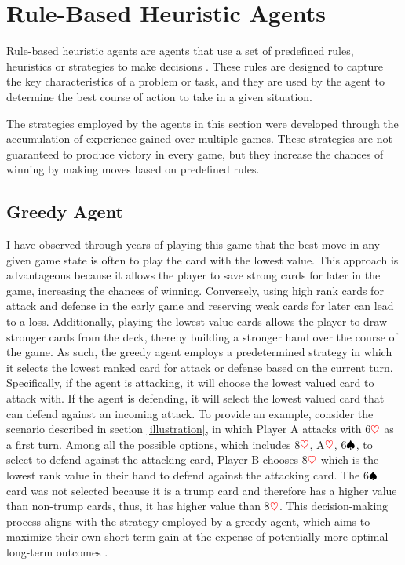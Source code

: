 \section{Rule-Based Heuristic Agents}

Rule-based heuristic agents are agents that use a set of predefined rules, heuristics or strategies to make decisions \citep{millington_funge_2009}. These rules are designed to capture the key characteristics of a problem or task, and they are used by the agent to determine the best course of action to take in a given situation.

The strategies employed by the agents in this section were developed through the accumulation of experience gained over multiple games. These strategies are not guaranteed to produce victory in every game, but they increase the chances of winning by making moves based on predefined rules. 

\subsection{Greedy Agent}

I have observed through years of playing this game that the best move in any given game state is often to play the card with the lowest value. This approach is advantageous because it allows the player to save strong cards for later in the game, increasing the chances of winning. Conversely, using high rank cards for attack and defense in the early game and reserving weak cards for later can lead to a loss. Additionally, playing the lowest value cards allows the player to draw stronger cards from the deck, thereby building a stronger hand over the course of the game. As such, the greedy agent employs a predetermined strategy in which it selects the lowest ranked card for attack or defense based on the current turn. Specifically, if the agent is attacking, it will choose the lowest valued card to attack with. If the agent is defending, it will select the lowest valued card that can defend against an incoming attack. To provide an example, consider the scenario described in section \ref{illustration}, in which Player A attacks with 6$\textcolor{red}{\heartsuit}$ as a first turn. Among all the possible options, which includes 8$\textcolor{red}{\heartsuit}$, A$\textcolor{red}{\heartsuit}$, 6$\textcolor{black}{\spadesuit}$, to select to defend against the attacking card, Player B chooses 8$\textcolor{red}{\heartsuit}$ which is the lowest rank value in their hand to defend against the attacking card. The 6$\textcolor{black}{\spadesuit}$ card was not selected because it is a trump card and therefore has a higher value than non-trump cards, thus, it has higher value than 8$\textcolor{red}{\heartsuit}$. This decision-making process aligns with the strategy employed by a greedy agent, which aims to maximize their own short-term gain at the expense of potentially more optimal long-term outcomes \citep{AI4Ed}.

